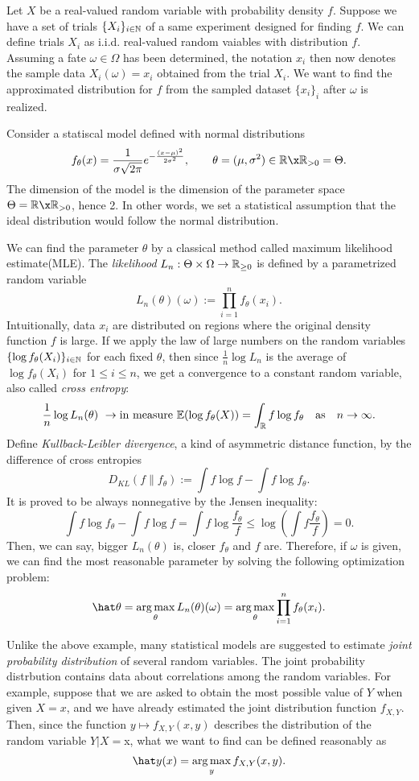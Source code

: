 \documentclass{../exp}
\begin{document}
\begin{ex}
Let $X$ be a real-valued random variable with probability density $f$.
Suppose we have a set of trials $\{X_i\}_{i\in\mathbb{N}}$ of a same experiment designed for finding $f$.
We can define trials $X_i$ as i.i.d. real-valued random vaiables with distribution $f$.
Assuming a fate $\omega\in\Omega$ has been determined, the notation $x_i$ then now denotes the sample data $X_i(\omega)=x_i$ obtained from the trial $X_i$.
We want to find the approximated distribution for $f$ from the sampled dataset $\{x_i\}_i$ after $\omega$ is realized.

Consider a statiscal model defined with normal distributions
\[f_\theta(x)=\frac1{\sigma\sqrt{2\pi}}e^{-\frac{(x-\mu)^2}{2\sigma^2}},\qquad\theta=(\mu,\sigma^2)\in\R\x\R_{>0}=\Theta.\]
The dimension of the model is the dimension of the parameter space $\Theta=\R\x\R_{>0}$, hence 2.
In other words, we set a statistical assumption that the ideal distribution would follow the normal distribution.

We can find the parameter $\theta$ by a classical method called maximum likelihood estimate(MLE).
The \emph{likelihood} $L_n:\Theta\times\Omega\to\mathbb{R}_{\ge0}$ is defined by a parametrized random variable
\[L_n(\theta)(\omega):=\prod_{i=1}^nf_\theta(x_i).\]
Intuitionally, data $x_i$ are distributed on regions where the original density function $f$ is large.
If we apply the law of large numbers on the random variables $\{\log f_\theta(X_i)\}_{i\in\mathbb{N}}$ for each fixed $\theta$, then since $\frac1n\log L_n$ is the average of $\log f_\theta(X_i)$ for $1\le i\le n$, we get a convergence to a constant random variable, also called \emph{cross entropy}:
\[\frac1n\log L_n(\theta)\ \to{\text{in measure}}\ \mathbb{E}(\log f_\theta(X))=\int_{\mathbb{R}} f\log f_\theta\quad\text{as}\quad n\to\infty.\]
Define \emph{Kullback-Leibler divergence}, a kind of asymmetric distance function, by the difference of cross entropies
\[D_{KL}(f\|f_\theta):=\int f\log f-\int f\log f_\theta.\]
It is proved to be always nonnegative by the Jensen inequality: 
\[\int f\log f_\theta-\int f\log f=\int f\log\frac{f_\theta}f\le\log\left(\int f\frac{f_\theta}f\right)=0.\]
Then, we can say, bigger $L_n(\theta)$ is, closer $f_\theta$ and $f$ are.
Therefore, if $\omega$ is given, we can find the most reasonable parameter by solving the following optimization problem:
\[\hat\theta=\argmax_\theta L_n(\theta)(\omega)=\argmax_\theta\prod_{i=1}^nf_\theta(x_i).\]
\end{ex}

Unlike the above example, many statistical models are suggested to estimate \emph{joint probability distribution} of several random variables.
The joint probability distrbution contains data about correlations among the random variables.
For example, suppose that we are asked to obtain the most possible value of $Y$ when given $X=x$, and we have already estimated the joint distribution function $f_{X,Y}$.
Then, since the function $y\mapsto f_{X,Y}(x,y)$ describes the distribution of the random variable $Y|X=$x, what we want to find can be defined reasonably as
\[\hat y(x)=\argmax_yf_{X,Y}(x,y).\]
\end{document}
